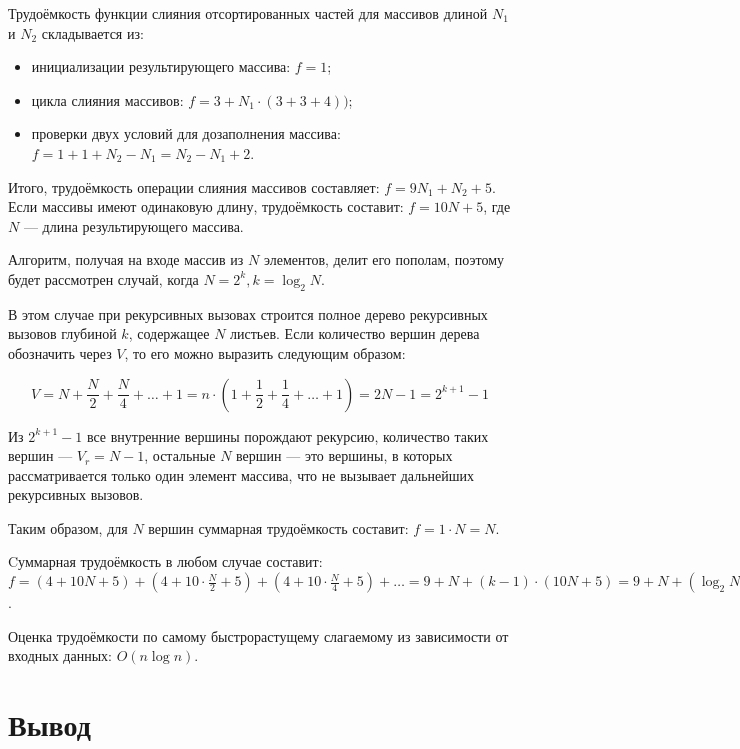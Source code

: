 Трудоёмкость функции слияния отсортированных частей для массивов длиной $N_1$ и $N_2$ складывается из:

\begin{itemize}
	\item[---] инициализации результирующего массива: $f = 1$;
	\item[---] цикла слияния массивов: $f = 3 + N_1 \cdot (3 + 3 + 4))$;
	\item[---] проверки двух условий для дозаполнения массива: $f = 1 + 1 + N_2 - N_1 = N_2 - N_1 + 2$.
\end{itemize}

Итого, трудоёмкость операции слияния массивов составляет: $f = 9N_1 + N_2 + 5$. Если массивы имеют одинаковую длину, трудоёмкость составит: $f = 10N + 5$, где $N$ --- длина результирующего массива.

Алгоритм, получая на входе массив из $N$ элементов, делит его пополам, поэтому будет рассмотрен случай, когда $N = 2^k, k = \log_2 N$.

В этом случае при рекурсивных вызовах строится полное дерево рекурсивных вызовов глубиной $k$, содержащее $N$ листьев. Если количество вершин дерева обозначить через $V$, то его можно выразить следующим образом:

\begin{equation}
	V = N + \frac{N}{2} + \frac{N}{4} + \ldots + 1 = n \cdot (1 + \frac{1}{2} + \frac{1}{4} + \ldots + 1) = 2N - 1 = 2^{k+1} - 1
\end{equation}

Из $2^{k+1} - 1$ все внутренние вершины порождают рекурсию, количество таких вершин --- $V_r = N - 1$, остальные $N$ вершин --- это вершины, в которых рассматривается только один элемент массива, что не вызывает дальнейших рекурсивных вызовов.

Таким образом, для $N$ вершин суммарная трудоёмкость составит: $f = 1 \cdot N = N$.

Cуммарная трудоёмкость в любом случае составит: $f = (4 + 10N + 5) + (4 + 10\cdot\frac{N}{2} + 5) + (4 + 10 \cdot \frac{N}{4} + 5) + \ldots = 9 + N + (k - 1) \cdot (10N + 5) = 9 + N + (\log_2 N - 1) \cdot (10N + 5) = 10N\log_2 N + 5\log_2 N - 9N +4$. 


Оценка трудоёмкости по самому быстрорастущему слагаемому из зависимости от входных данных: $O(n\log n)$.


\section*{Вывод}

